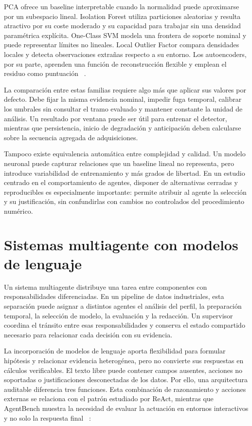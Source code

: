 PCA ofrece un baseline interpretable cuando la normalidad puede aproximarse por
un subespacio lineal. Isolation Forest utiliza particiones aleatorias y resulta
atractivo por su coste moderado y su capacidad para trabajar sin una densidad
paramétrica explícita. One-Class SVM modela una frontera de soporte nominal y
puede representar límites no lineales. Local Outlier Factor compara densidades
locales y detecta observaciones extrañas respecto a su entorno. Los
autoencoders, por su parte, aprenden una función de reconstrucción flexible y
emplean el residuo como puntuación
~\cite{liu2008_isolation_forest,scholkopf2001_support_estimation,breunig2000_lof}.

La comparación entre estas familias requiere algo más que aplicar sus valores
por defecto. Debe fijar la misma evidencia nominal, impedir fuga temporal,
calibrar los umbrales sin consultar el tramo evaluado y mantener constante la
unidad de análisis. Un resultado por ventana puede ser útil para entrenar el
detector, mientras que persistencia, inicio de degradación y anticipación deben
calcularse sobre la secuencia agregada de adquisiciones.

Tampoco existe equivalencia automática entre complejidad y calidad. Un modelo
neuronal puede capturar relaciones que un baseline lineal no representa, pero
introduce variabilidad de entrenamiento y más grados de libertad. En un estudio
centrado en el comportamiento de agentes, disponer de alternativas cerradas y
reproducibles es especialmente importante: permite atribuir al agente la
selección y su justificación, sin confundirlas con cambios no controlados del
procedimiento numérico.

\section{Sistemas multiagente con modelos de lenguaje}

Un sistema multiagente distribuye una tarea entre componentes con
responsabilidades diferenciadas. En un pipeline de datos industriales, esta
separación puede asignar a distintos agentes el análisis del perfil, la
preparación temporal, la selección de modelo, la evaluación y la redacción. Un
supervisor coordina el tránsito entre esas responsabilidades y conserva el
estado compartido necesario para relacionar cada decisión con su evidencia.

La incorporación de modelos de lenguaje aporta flexibilidad para formular
hipótesis y relacionar evidencia heterogénea, pero no convierte sus respuestas
en cálculos verificables. El texto libre puede contener campos ausentes,
acciones no soportadas o justificaciones desconectadas de los datos. Por ello,
una arquitectura auditable diferencia tres funciones. Esta combinación de
razonamiento y acciones externas se relaciona con el patrón estudiado por
ReAct, mientras que AgentBench muestra la necesidad de evaluar la actuación en
entornos interactivos y no solo la respuesta final
~\cite{yao2023_react,liu2024_agentbench}:

